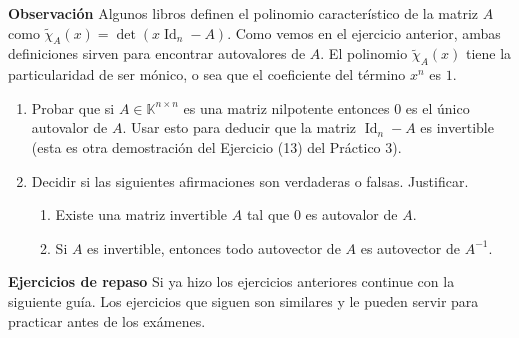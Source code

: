 \textbf{Observación} Algunos libros definen el polinomio característico de la matriz $A$ como $\tilde\chi_A(x)=\det(x\operatorname{Id}_n-A)$. Como vemos en el ejercicio anterior, ambas definiciones sirven para encontrar autovalores de $A$. El polinomio $\tilde\chi_A(x)$ tiene la particularidad de ser mónico, o sea que el coeficiente del término $x^n$ es $1$.

\begin{enumerate}[resume,topsep=6pt,itemsep=.4cm]

\item Probar que si $A\in\mathbb{K}^{n\times n}$ es una matriz nilpotente entonces $0$ es el único autovalor de $A$. Usar esto para deducir que la matriz $\operatorname{Id}_n-A$ es invertible (esta es otra demostración del Ejercicio (13) del Práctico 3).


\item Decidir si las siguientes afirmaciones son verdaderas o falsas. Justificar.

\begin{enumerate}
    \item Existe una matriz invertible $A$ tal que $0$ es autovalor de $A$.
    \item  Si $A$ es invertible, entonces todo autovector de $A$ es autovector de $A^{-1}$.
\end{enumerate}

\end{enumerate}

\textbf{Ejercicios de repaso}
Si ya hizo los ejercicios anteriores continue con la siguiente guía. Los ejercicios que siguen son similares y le pueden servir para practicar antes de los exámenes.


